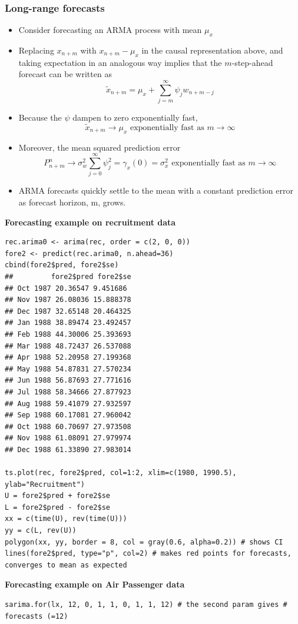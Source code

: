\documentclass[11pt]{article}
\newcommand{\noi}{\noindent}
\begin{document}
\subsubsection{Long-range forecasts}
\begin{itemize}
    \item Consider forecasting an ARMA process with mean $\mu_x$
    \item Replacing $x_{n+m}$ with $x_{n+m} - \mu_x$ in the causal representation above, and taking expectation in an analogous way implies that the $m$-step-ahead forecast can be written as
        $$\tilde{x}_{n+m} = \mu_x + \sum_{j=m}^{\infty}\psi_jw_{n+m-j}$$
    \item Because the $\psi$ dampen to zero exponentially fast,
        $$\tilde{x}_{n+m} \rightarrow \mu_x \text{ exponentially fast as } m \rightarrow \infty$$
    \item Moreover, the mean squared prediction error
        $$P_{n+m}^n \rightarrow \sigma_w^2\sum_{j=0}^{\infty}\psi_j^2 = \gamma_x(0) = \sigma_x^2 \text{ exponentially fast as } m \rightarrow \infty$$
    \item ARMA forecasts quickly settle to the mean with a constant prediction error as forecast horizon, m, grows.
\end{itemize} \phantom{i}

\noi \textbf{Forecasting example on recruitment data}
\begin{lstlisting}
rec.arima0 <- arima(rec, order = c(2, 0, 0))
fore2 <- predict(rec.arima0, n.ahead=36)
cbind(fore2$pred, fore2$se)
##         fore2$pred fore2$se
## Oct 1987 20.36547 9.451686
## Nov 1987 26.08036 15.888378
## Dec 1987 32.65148 20.464325
## Jan 1988 38.89474 23.492457
## Feb 1988 44.30006 25.393693
## Mar 1988 48.72437 26.537088
## Apr 1988 52.20958 27.199368
## May 1988 54.87831 27.570234
## Jun 1988 56.87693 27.771616
## Jul 1988 58.34666 27.877923
## Aug 1988 59.41079 27.932597
## Sep 1988 60.17081 27.960042
## Oct 1988 60.70697 27.973508
## Nov 1988 61.08091 27.979974
## Dec 1988 61.33890 27.983014

ts.plot(rec, fore2$pred, col=1:2, xlim=c(1980, 1990.5), ylab="Recruitment")
U = fore2$pred + fore2$se
L = fore2$pred - fore2$se
xx = c(time(U), rev(time(U)))
yy = c(L, rev(U))
polygon(xx, yy, border = 8, col = gray(0.6, alpha=0.2)) # shows CI
lines(fore2$pred, type="p", col=2) # makes red points for forecasts, converges to mean as expected
\end{lstlisting}

\noi \textbf{Forecasting example on Air Passenger data}
\begin{lstlisting}
sarima.for(lx, 12, 0, 1, 1, 0, 1, 1, 12) # the second param gives # forecasts (=12)
\end{lstlisting}
\end{document}
